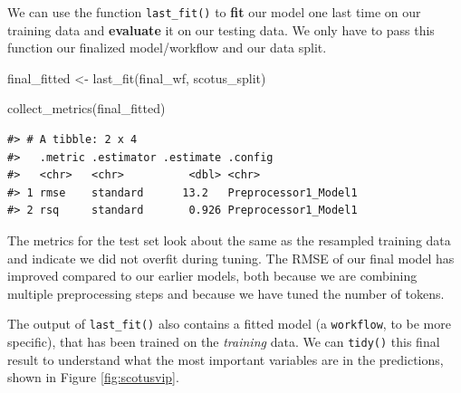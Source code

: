 \documentclass[
]{krantz}
\makeatletter
\newenvironment{Shaded}{\begin{snugshade}}{\end{snugshade}}
\newcommand{\FunctionTok}[1]{\textcolor[rgb]{0.00,0.00,0.00}{#1}}
\newcommand{\NormalTok}[1]{#1}
\newcommand{\OtherTok}[1]{\textcolor[rgb]{0.56,0.35,0.01}{#1}}
\newenvironment{kframe}{%
\medskip{}
\setlength{\fboxsep}{.8em}
 \def\at@end@of@kframe{}%
 \ifinner\ifhmode%
  \def\at@end@of@kframe{\end{minipage}}%
  \begin{minipage}{\columnwidth}%
 \fi\fi%
 \def\FrameCommand##1{\hskip\@totalleftmargin \hskip-\fboxsep
 \colorbox{shadecolor}{##1}\hskip-\fboxsep
     \hskip-\linewidth \hskip-\@totalleftmargin \hskip\columnwidth}%
 \MakeFramed {\advance\hsize-\width
   \@totalleftmargin\z@ \linewidth\hsize
   \@setminipage}}%
 {\par\unskip\endMakeFramed%
 \at@end@of@kframe}
\renewenvironment{Shaded}{\begin{kframe}}{\end{kframe}}
\makeatother
\begin{document}
We can use the function \texttt{last\_fit()} to \textbf{fit} our model one last time on our training data and \textbf{evaluate} it on our testing data. We only have to pass this function our finalized model/workflow and our data split.

\begin{Shaded}
\begin{Highlighting}[]
\NormalTok{final\_fitted }\OtherTok{\textless{}{-}} \FunctionTok{last\_fit}\NormalTok{(final\_wf, scotus\_split)}

\FunctionTok{collect\_metrics}\NormalTok{(final\_fitted)}
\end{Highlighting}
\end{Shaded}

\begin{verbatim}
#> # A tibble: 2 x 4
#>   .metric .estimator .estimate .config             
#>   <chr>   <chr>          <dbl> <chr>               
#> 1 rmse    standard      13.2   Preprocessor1_Model1
#> 2 rsq     standard       0.926 Preprocessor1_Model1
\end{verbatim}

The metrics for the test set look about the same as the resampled training data and indicate we did not overfit during tuning. The RMSE of our final model has improved compared to our earlier models, both because we are combining multiple preprocessing steps and because we have tuned the number of tokens.

The output of \texttt{last\_fit()} also contains a fitted model (a \texttt{workflow}, to be more specific), that has been trained on the \emph{training} data. We can \texttt{tidy()} this final result to understand what the most important variables are in the predictions, shown in Figure \ref{fig:scotusvip}.
\end{document}
